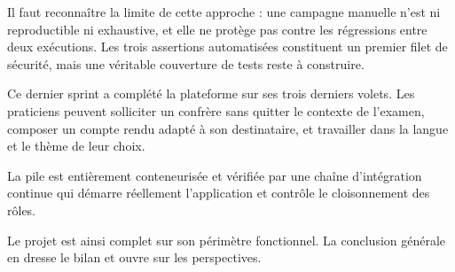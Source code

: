 Il faut reconnaître la limite de cette approche : une campagne manuelle n'est ni reproductible
ni exhaustive, et elle ne protège pas contre les régressions entre deux exécutions. Les trois
assertions automatisées constituent un premier filet de sécurité, mais une véritable couverture
de tests reste à construire.


Ce dernier sprint a complété la plateforme sur ses trois derniers volets. Les praticiens peuvent
solliciter un confrère sans quitter le contexte de l'examen, composer un compte rendu adapté à
son destinataire, et travailler dans la langue et le thème de leur choix.

La pile est entièrement conteneurisée et vérifiée par une chaîne d'intégration continue qui
démarre réellement l'application et contrôle le cloisonnement des rôles.

Le projet est ainsi complet sur son périmètre fonctionnel. La conclusion générale en dresse le
bilan et ouvre sur les perspectives.
